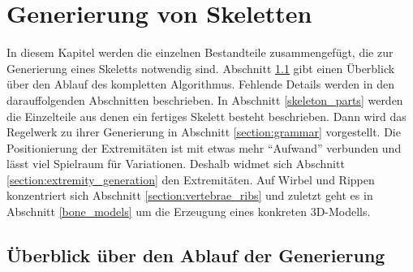 \chapter{Generierung von Skeletten}
\label{chapter:skeleton_generation}

In diesem Kapitel werden die einzelnen Bestandteile zusammengefügt, die zur Generierung eines Skeletts notwendig sind. 
Abschnitt \ref{section:overview} gibt einen Überblick über den Ablauf des kompletten Algorithmus. Fehlende Details werden in den darauffolgenden Abschnitten beschrieben.
In Abschnitt \ref{skeleton_parts} werden die Einzelteile aus denen ein fertiges Skelett besteht beschrieben. Dann wird das Regelwerk zu ihrer Generierung in Abschnitt \ref{section:grammar} vorgestellt. Die Positionierung der Extremitäten ist mit etwas mehr "`Aufwand"' verbunden und lässt viel Spielraum für Variationen. Deshalb widmet sich Abschnitt \ref{section:extremity_generation} den Extremitäten. Auf Wirbel und Rippen konzentriert sich Abschnitt \ref{section:vertebrae_ribs} und zuletzt geht es in Abschnitt \ref{bone_models} um die Erzeugung eines konkreten 3D-Modells.


\section{Überblick über den Ablauf der Generierung}
\label{section:overview}

\vspace{0.1cm}


